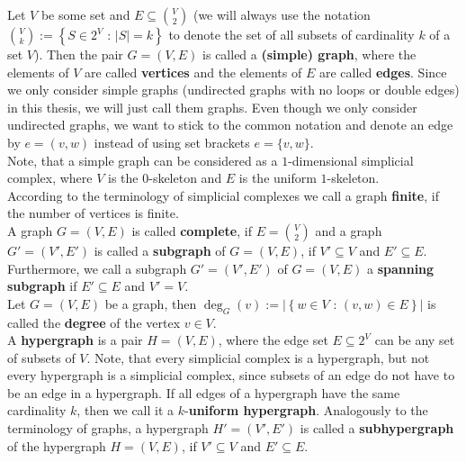 Let \(V\) be some set and \(E\subseteq\binom{V}{2}\) (we will always use the notation\\
\(\binom{V}{k}:=\left\{S\in 2^V\text{ : }\left|S\right|=k\right\}\) to denote the set of all subsets of cardinality \(k\) of a set \(V\)). Then the pair \(G=\left(V,E\right)\) is called a \textbf{(simple) graph}, where the elements of \(V\) are called \textbf{vertices} and the elements of \(E\) are called \textbf{edges}. Since we only consider simple graphs (undirected graphs with no loops or double edges) in this thesis, we will just call them graphs. Even though we only consider undirected graphs, we want to stick to the common notation and denote an edge by \(e=(v,w)\) instead of using set brackets \(e=\{v,w\}\).\\
Note, that a simple graph can be considered as a \(1\)-dimensional simplicial complex, where \(V\) is the \(0\)-skeleton and \(E\) is the uniform \(1\)-skeleton.\\
According to the terminology of simplicial complexes we call a graph \textbf{finite}, if the number of vertices is finite.\\
A graph \(G=(V,E)\) is called \textbf{complete}, if \(E=\binom{V}{2}\) and a graph \(G'=(V',E')\) is called a \textbf{subgraph} of \(G=(V,E)\), if \(V'\subseteq V\) and \(E'\subseteq E\). Furthermore, we call a subgraph \(G'=(V',E')\) of \(G=(V,E)\) a \textbf{spanning subgraph} if \(E'\subseteq E\) and \(V'=V\).\\
Let \(G=(V,E)\) be a graph, then \(\deg_G(v):=\left|\left\{w\in V\text{ : }(v,w)\in E\right\}\right|\) is called the \textbf{degree} of the vertex \(v\in V\).\\
A \textbf{hypergraph} is a pair \(H=(V,E)\), where the edge set \(E\subseteq 2^V\) can be any set of subsets of \(V\). Note, that every simplicial complex is a hypergraph, but not every hypergraph is a simplicial complex, since subsets of an edge do not have to be an edge in a hypergraph. If all edges of a hypergraph have the same cardinality \(k\), then we call it a \(k\)-\textbf{uniform hypergraph}. Analogously to the terminology of graphs, a hypergraph \(H'=(V',E')\) is called a \textbf{subhypergraph} of the hypergraph \(H=(V,E)\), if \(V'\subseteq V\) and \(E'\subseteq E\).

